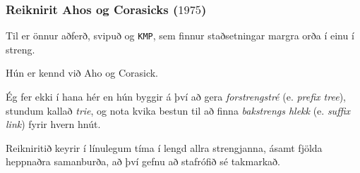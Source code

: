 {
	\frametitle{Reiknirit Ahos og Corasicks ($1975$)}
	{
		\item<1-> Til er önnur aðferð, svipuð og \texttt{KMP}, sem finnur staðsetningar margra orða í einu í streng.
		\item<2-> Hún er kennd við Aho og Corasick.
		\item<3-> Ég fer ekki í hana hér en hún byggir á því að gera \emph{forstrengstré} (e. \emph{prefix tree}), stundum kallað \emph{trie}, og
					nota kvika bestun til að finna \emph{bakstrengs hlekk} (e. \emph{suffix link}) fyrir hvern hnút.
		\item<4-> Reikniritið keyrir í línulegum tíma í lengd allra strengjanna, ásamt fjölda heppnaðra samanburða,
					að því gefnu að stafrófið sé takmarkað.
	}
}

{
}



